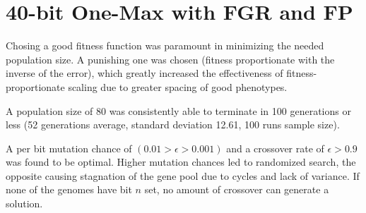 \section{40-bit One-Max with FGR and FP}

Chosing a good fitness function was paramount in minimizing the needed population size. A punishing one was chosen (fitness proportionate with the inverse of the error), which greatly increased the effectiveness of fitness-proportionate scaling due to greater spacing of good phenotypes.

A population size of 80 was consistently able to terminate in 100 generations or less (52 generations average, standard deviation 12.61, 100 runs sample size).

A per bit mutation chance of $(0.01 > \epsilon > 0.001)$ and a crossover rate of $ \epsilon > 0.9 $ was found to be optimal. Higher mutation chances led to randomized search, the opposite causing stagnation of the gene pool due to cycles and lack of variance. If none of the genomes have bit $n$ set, no amount of crossover can generate a solution.

